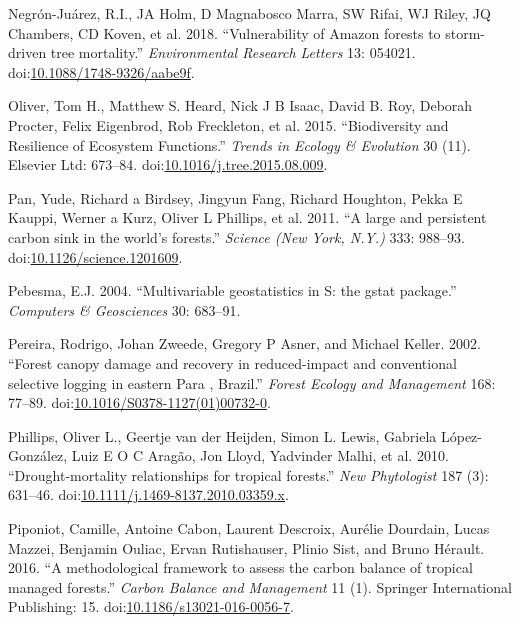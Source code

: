\documentclass[]{elsarticle} %
\begin{document}
\hypertarget{ref-Negron-Juarez2018}{}
Negrón-Juárez, R.I., JA Holm, D Magnabosco Marra, SW Rifai, WJ Riley, JQ
Chambers, CD Koven, et al. 2018. ``Vulnerability of Amazon forests to
storm-driven tree mortality.'' \emph{Environmental Research Letters} 13:
054021.
doi:\href{https://doi.org/10.1088/1748-9326/aabe9f}{10.1088/1748-9326/aabe9f}.

\hypertarget{ref-Oliver2015}{}
Oliver, Tom H., Matthew S. Heard, Nick J B Isaac, David B. Roy, Deborah
Procter, Felix Eigenbrod, Rob Freckleton, et al. 2015. ``Biodiversity
and Resilience of Ecosystem Functions.'' \emph{Trends in Ecology \&
Evolution} 30 (11). Elsevier Ltd: 673--84.
doi:\href{https://doi.org/10.1016/j.tree.2015.08.009}{10.1016/j.tree.2015.08.009}.

\hypertarget{ref-Pan2011}{}
Pan, Yude, Richard a Birdsey, Jingyun Fang, Richard Houghton, Pekka E
Kauppi, Werner a Kurz, Oliver L Phillips, et al. 2011. ``A large and
persistent carbon sink in the world's forests.'' \emph{Science (New
York, N.Y.)} 333: 988--93.
doi:\href{https://doi.org/10.1126/science.1201609}{10.1126/science.1201609}.

\hypertarget{ref-gstat}{}
Pebesma, E.J. 2004. ``Multivariable geostatistics in S: the gstat
package.'' \emph{Computers \& Geosciences} 30: 683--91.

\hypertarget{ref-Pereira2002}{}
Pereira, Rodrigo, Johan Zweede, Gregory P Asner, and Michael Keller.
2002. ``Forest canopy damage and recovery in reduced-impact and
conventional selective logging in eastern Para , Brazil.'' \emph{Forest
Ecology and Management} 168: 77--89.
doi:\href{https://doi.org/10.1016/S0378-1127(01)00732-0}{10.1016/S0378-1127(01)00732-0}.

\hypertarget{ref-Phillips2010}{}
Phillips, Oliver L., Geertje van der Heijden, Simon L. Lewis, Gabriela
López-González, Luiz E O C Aragão, Jon Lloyd, Yadvinder Malhi, et al.
2010. ``Drought-mortality relationships for tropical forests.''
\emph{New Phytologist} 187 (3): 631--46.
doi:\href{https://doi.org/10.1111/j.1469-8137.2010.03359.x}{10.1111/j.1469-8137.2010.03359.x}.

\hypertarget{ref-Piponiot2016}{}
Piponiot, Camille, Antoine Cabon, Laurent Descroix, Aurélie Dourdain,
Lucas Mazzei, Benjamin Ouliac, Ervan Rutishauser, Plinio Sist, and Bruno
Hérault. 2016. ``A methodological framework to assess the carbon balance
of tropical managed forests.'' \emph{Carbon Balance and Management} 11
(1). Springer International Publishing: 15.
doi:\href{https://doi.org/10.1186/s13021-016-0056-7}{10.1186/s13021-016-0056-7}.
\end{document}
